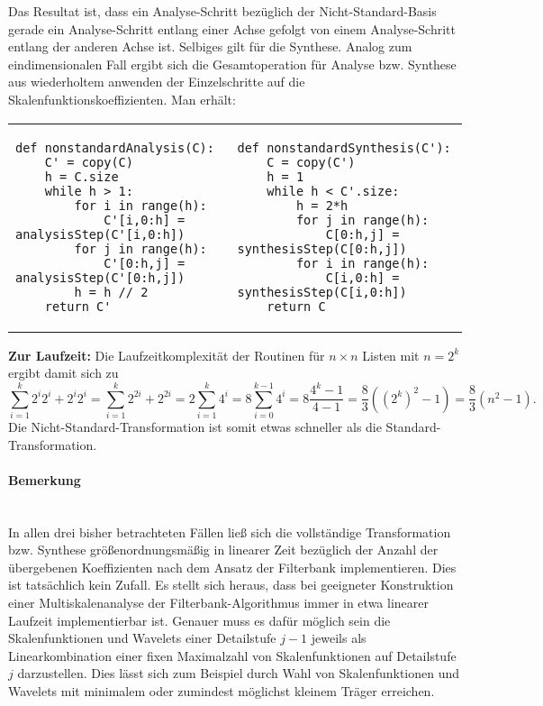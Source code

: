 %
Das Resultat ist, dass ein Analyse-Schritt bezüglich der Nicht-Standard-Basis gerade ein Analyse-Schritt entlang einer Achse gefolgt von einem Analyse-Schritt entlang der anderen Achse ist. Selbiges gilt für die Synthese. Analog zum eindimensionalen Fall ergibt sich die Gesamtoperation für Analyse bzw. Synthese aus wiederholtem anwenden der Einzelschritte auf die Skalenfunktionskoeffizienten. Man erhält:

\begin{adjustbox}{max width=\textwidth ,center}
\begin{tabular}{p{}|p{}}
\begin{verbatim}
def nonstandardAnalysis(C):
    C' = copy(C)
    h = C.size
    while h > 1:
        for i in range(h):
            C'[i,0:h] = analysisStep(C'[i,0:h])
        for j in range(h):
            C'[0:h,j] = analysisStep(C'[0:h,j])
        h = h // 2
    return C'
\end{verbatim}
&
\begin{verbatim}
def nonstandardSynthesis(C'):
    C = copy(C')
    h = 1
    while h < C'.size:
        h = 2*h
        for j in range(h):
            C[0:h,j] = synthesisStep(C[0:h,j])
        for i in range(h):
            C[i,0:h] = synthesisStep(C[i,0:h])
    return C
\end{verbatim}
\\
\end{tabular}
\end{adjustbox}

\noindent \textbf{Zur Laufzeit:} Die Laufzeitkomplexität der Routinen für $n \times n$ Listen mit $n=2^k$ ergibt damit sich zu 
%
\[
\sum_{i=1}^k 2^i 2^i + 2^i 2^i
= \sum_{i=1}^k 2^{2i} + 2^{2i} 
= 2\sum_{i=1}^k 4^i 
= 8\sum_{i=0}^{k-1} 4^i 
= 8\frac{4^k-1}{4-1} 
= \frac{8}{3}((2^k)^2-1) 
= \frac{8}{3}(n^2-1)
.
\]
%
Die Nicht-Standard-Transformation ist somit etwas schneller als die Standard-Transformation.
%
\paragraph{Bemerkung}~\\
In allen drei bisher betrachteten Fällen ließ sich die vollständige Transformation bzw. Synthese größenordnungsmäßig in linearer Zeit bezüglich der Anzahl der übergebenen Koeffizienten nach dem Ansatz der Filterbank implementieren. Dies ist tatsächlich kein Zufall. Es stellt sich heraus, dass bei geeigneter Konstruktion einer Multiskalenanalyse der Filterbank-Algorithmus immer in etwa linearer Laufzeit implementierbar ist. Genauer muss es dafür möglich sein die Skalenfunktionen und Wavelets einer Detailstufe $j-1$ jeweils als Linearkombination einer fixen Maximalzahl von Skalenfunktionen auf Detailstufe $j$ darzustellen. Dies lässt sich zum Beispiel durch Wahl von Skalenfunktionen und Wavelets mit minimalem oder zumindest möglichst kleinem Träger erreichen.
%
